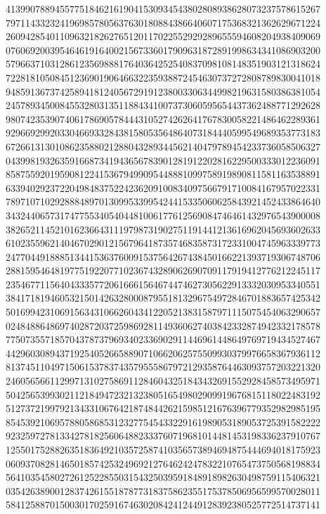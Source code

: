 {{    4139907889455775184621619041530934543802808938628073237578615267 ~
    7971143323241969857805637630180884386640607175368321362629671224 ~
    2609428540110963218262765120117022552929289655594608204938409069 ~
    0760692003954646191640021567336017909631872891998634341086903200 ~
    5796637103128612356988817640364252540837098108148351903121318624 ~
    7228181050845123690190646632235938872454630737272808789830041018 ~
    9485913673742589418124056729191238003306344998219631580386381054 ~
    2457893450084553280313511884341007373060595654437362488771292628 ~
    9807423539074061786905784443105274262641767830058221486462289361 ~
    9296692992033046693328438158053564864073184440599549689353773183 ~
    6726613130108623588021288043289344562140479789454233736058506327 ~
    0439981932635916687341943656783901281912202816229500333012236091 ~
    8587559201959081224153679499095448881099758919890811581163538891 ~
    6339402923722049848375224236209100834097566791710084167957022331 ~
    7897107102928884897013099533995424415335060625843921452433864640 ~
    3432440657317477553405404481006177612569084746461432976543900008 ~
    3826521145210162366431119798731902751191441213616962045693602633 ~
    6102355962140467029012156796418735746835873172331004745963339773 ~
    2477044918885134415363760091537564267438450166221393719306748706 ~
    2881595464819775192207710236743289062690709117919412776212245117 ~
    2354677115640433357720616661564674474627305622913332030953340551 ~
    3841718194605321501426328000879551813296754972846701883657425342 ~
    5016994231069156343106626043412205213831587971115075454063290657 ~
    0248488648697402872037259869281149360627403842332874942332178578 ~
    7750735571857043787379693402336902911446961448649769719434527467 ~
    4429603089437192540526658890710662062575509930379976658367936112 ~
    8137451104971506153783743579555867972129358764463093757203221320 ~
    2460565661129971310275869112846043251843432691552928458573495971 ~
    5042565399302112184947232132380516549802909919676815118022483192 ~
    5127372199792134331067642187484426215985121676396779352982985195 ~
    8545392106957880586853123277545433229161989053189053725391582222 ~
    9232597278133427818256064882333760719681014481453198336237910767 ~
    1255017528826351836492103572587410356573894694875444694018175923 ~
    0609370828146501857425324969212764624247832210765473750568198834 ~
    5641035458027261252285503154325039591848918982630498759115406321 ~
    0354263890012837426155187877318375862355175378506956599570028011 ~
    5841258870150030170259167463020842412449128392380525772514737141 ~
}}

